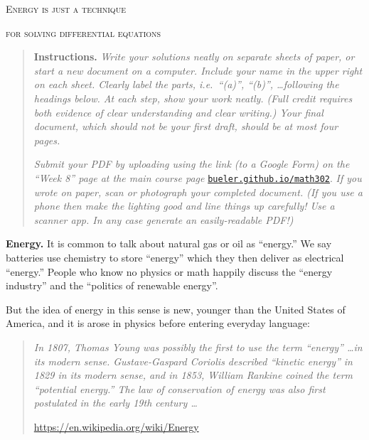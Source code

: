 \documentclass[12pt]{article}
\begin{document}
\renewcommand{\d}{\displaystyle}

\strut
\centerline{{\Large \textsc{Energy is just a technique}}}

\smallskip

\centerline{{\Large \textsc{for solving differential equations}}}

\medskip
\small
\begin{quote}
\textbf{Instructions.}  \emph{Write your solutions neatly on separate sheets of paper, or start a new document on a computer.  Include your name in the upper right on each sheet.  Clearly label the parts, i.e.~``\emph{(a)}'', ``\emph{(b)}'', \dots following the headings below.  At each step, show your work neatly.  (Full credit requires both evidence of clear understanding \emph{and} clear writing.)  Your final document, which should \emph{not} be your first draft, should be at most four pages.}

\emph{Submit your PDF by uploading using the link (to a Google Form) on the ``Week 8'' page at the main course page} \href{https://bueler.github.io/math302/index.html}{\texttt{bueler.github.io/math302}}.  \emph{If you wrote on paper, scan or photograph your completed document.  (If you use a phone then make the lighting good and line things up carefully!  Use a scanner app.  In any case generate an easily-readable PDF!)}
\end{quote}

\normalsize
\bigskip


\textbf{Energy.}  It is common to talk about natural gas or oil as ``energy.''   We say batteries use chemistry to store ``energy'' which they then deliver as electrical ``energy.''  People who know no physics or math happily discuss the ``energy industry'' and the ``politics of renewable energy''.

But the idea of energy in this sense is new, younger than the United States of America, and it is arose in physics before entering everyday language:

\small

\begin{quotation}
\noindent \emph{In 1807, Thomas Young was possibly the first to use the term ``energy'' \dots in its modern sense.  Gustave-Gaspard Coriolis described ``kinetic energy'' in 1829 in its modern sense, and in 1853, William Rankine coined the term ``potential energy.''  The law of conservation of energy was also first postulated in the early 19th century \dots}

\hfill \url{https://en.wikipedia.org/wiki/Energy}
\end{quotation}
\end{document}
